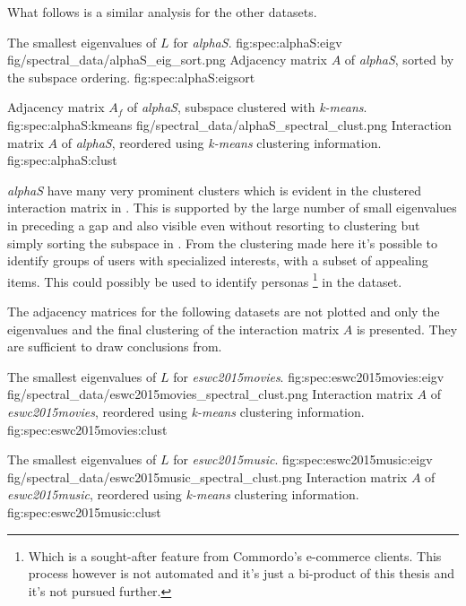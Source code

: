 \FloatBarrier

What follows is a similar analysis for the other datasets.

\FloatBarrier

{The smallest eigenvalues of $L$ for \textit{alphaS}.}
{fig:spec:alphaS:eigv}
{fig/spectral_data/alphaS_eig_sort.png}
{Adjacency matrix $A$ of \textit{alphaS}, sorted by the subspace ordering.}
{fig:spec:alphaS:eigsort}

{Adjacency matrix $A_f$ of \textit{alphaS}, subspace clustered with \textit{k-means}.}
{fig:spec:alphaS:kmeans}
{fig/spectral_data/alphaS_spectral_clust.png}
{Interaction matrix $A$ of \textit{alphaS}, reordered using \textit{k-means} clustering information.}
{fig:spec:alphaS:clust}

\FloatBarrier

\textit{alphaS} have many very prominent clusters which is evident in the clustered interaction matrix in . This is supported by the large number of small eigenvalues in  preceding a gap and also visible even without resorting to clustering but simply sorting the subspace in . From the clustering made here it's possible to identify groups of users with specialized interests, with a subset of appealing items. This could possibly be used to identify personas
\footnote{Which is a sought-after feature from Commordo's e-commerce clients. This process however is not automated and it's just a bi-product of this thesis and it's not pursued further.}
in the dataset.

The adjacency matrices for the following datasets are not plotted and only the eigenvalues and the final clustering of the interaction matrix $A$ is presented. They are sufficient to draw conclusions from.

\FloatBarrier

{The smallest eigenvalues of $L$ for \textit{eswc2015movies}.}
{fig:spec:eswc2015movies:eigv}
{fig/spectral_data/eswc2015movies_spectral_clust.png}
{Interaction matrix $A$ of \textit{eswc2015movies}, reordered using \textit{k-means} clustering information.}
{fig:spec:eswc2015movies:clust}

{The smallest eigenvalues of $L$ for \textit{eswc2015music}.}
{fig:spec:eswc2015music:eigv}
{fig/spectral_data/eswc2015music_spectral_clust.png}
{Interaction matrix $A$ of \textit{eswc2015music}, reordered using \textit{k-means} clustering information.}
{fig:spec:eswc2015music:clust}

